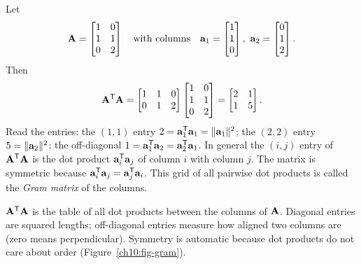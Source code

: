 \begin{example}\label{ch10:ex-ATA}
Let
\[
  \mathbf{A}=\begin{bmatrix} 1 & 0 \\ 1 & 1 \\ 0 & 2 \end{bmatrix}
  \quad\text{with columns}\quad
  \mathbf{a}_1=\begin{bmatrix}1\\1\\0\end{bmatrix},\ \mathbf{a}_2=\begin{bmatrix}0\\1\\2\end{bmatrix}.
\]
Then
\[
  \mathbf{A}^{\mathsf{T}}\mathbf{A}
  = \begin{bmatrix} 1 & 1 & 0 \\ 0 & 1 & 2 \end{bmatrix}
    \begin{bmatrix} 1 & 0 \\ 1 & 1 \\ 0 & 2 \end{bmatrix}
  = \begin{bmatrix} 2 & 1 \\ 1 & 5 \end{bmatrix}.
\]
Read the entries: the $(1,1)$ entry $2=\mathbf{a}_1^{\mathsf{T}}\mathbf{a}_1=\lVert\mathbf{a}_1\rVert^2$; the $(2,2)$ entry
$5=\lVert\mathbf{a}_2\rVert^2$; the off-diagonal $1=\mathbf{a}_1^{\mathsf{T}}\mathbf{a}_2=\mathbf{a}_2^{\mathsf{T}}\mathbf{a}_1$. In general the
$(i,j)$ entry of $\mathbf{A}^{\mathsf{T}}\mathbf{A}$ is the dot product $\mathbf{a}_i^{\mathsf{T}}\mathbf{a}_j$ of column $i$ with column
$j$. The matrix is symmetric because $\mathbf{a}_i^{\mathsf{T}}\mathbf{a}_j=\mathbf{a}_j^{\mathsf{T}}\mathbf{a}_i$. This grid
of all pairwise dot products is called the \emph{Gram matrix} of the columns.
\end{example}

\begin{focusbox}
$\mathbf{A}^{\mathsf{T}}\mathbf{A}$ is the table of all dot products between the columns of $\mathbf{A}$. Diagonal entries
are squared lengths; off-diagonal entries measure how aligned two columns are (zero means
perpendicular). Symmetry is automatic because dot products do not care about order
(Figure~\ref{ch10:fig-gram}).
\end{focusbox}

